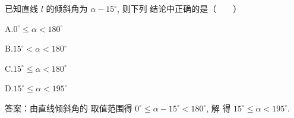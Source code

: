 \begin{exercise}{}
已知直线 $l$ 的倾斜角为 $\alpha-15^{\circ}$, 则下列 结论中正确的是（$\qquad$）

A.$0^{\circ} \leqslant \alpha<180^{\circ}$

B.$15^{\circ}<\alpha<180^{\circ}$

C.$15^{\circ} \leqslant \alpha<180^{\circ}$

D.$15^{\circ} \leqslant \alpha<195^{\circ}$

答案：由直线倾斜角的 取值范围得 $0^{\circ} \leqslant \alpha-15^{\circ}<180^{\circ}$, 解 得 $15^{\circ} \leqslant \alpha<195^{\circ}$.
\end{exercise}

